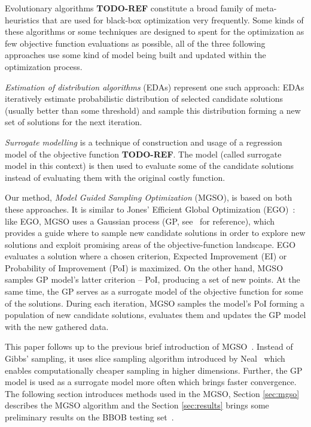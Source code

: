 \documentclass{itatnew}
\begin{document}
Evolutionary algorithms \textbf{TODO-REF} constitute a broad family of meta-heuristics that are used for black-box optimization very frequently. Some kinds of these algorithms or some techniques are designed to spent for the optimization as few objective function evaluations as possible, all of the three following approaches use some kind of model being built and updated within the optimization process.

\emph{Estimation of distribution algorithms} (EDAs) \cite{larranaga_estimation_2002} represent one such approach: EDAs iteratively estimate probabilistic distribution of selected candidate solutions (usually better than some threshold) and sample this distribution forming a new set of solutions for the next iteration. 

\emph{Surrogate modelling} is a technique of construction and usage of a regression model of the objective function \textbf{TODO-REF}. The model (called surrogate model in this context) is then used to evaluate some of the candidate solutions instead of evaluating them with the original costly function.

Our method, \emph{Model Guided Sampling Optimization} (MGSO), is based on both these approaches. It is similar to Jones' Efficient Global Optimization (EGO)~\cite{jones_efficient_1998}: like EGO, MGSO uses a Gaussian process (GP, see~\cite{rasmussen_gaussian_2006} for reference), which provides a guide where to sample new candidate solutions in order to explore new solutions and exploit promising areas of the objective-function landscape. EGO evaluates a solution where a chosen criterion, Expected Improvement (EI) or Probability of Improvement (PoI) is maximized. On the other hand, MGSO samples GP model's latter criterion -- PoI, producing a set of new points. At the same time, the GP serves as a surrogate model of the objective function for some of the solutions. During each iteration, MGSO samples the model's PoI forming a population of new candidate solutions, evaluates them and updates the GP model with the new gathered data.

This paper follows up to the previous brief introduction of MGSO~\cite{bajer_model_2013}. Instead of Gibbs' sampling, it uses slice sampling algorithm introduced by Neal~\cite{neal_slice_2003} which enables computationally cheaper sampling in higher dimensions. Further, the GP model is used as a surrogate model more often which brings faster convergence. The following section introduces methods used in the MGSO, Section \ref{sec:mgso} describes the MGSO algorithm and the Section \ref{sec:results} brings some preliminary results on the BBOB testing set~\cite{hansen_real_2009}.
\end{document}
